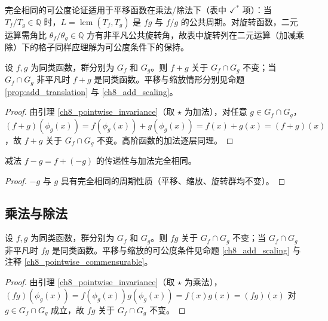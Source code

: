 \begin{remark}[平移与旋转在二元运算下的可公度条件]\label{ch8_pointwise_commensurable}
完全相同的可公度论证适用于平移函数在乘法/除法下（表中 $\checkmark^*$ 项）：当 $T_f/T_g\in\mathbb{Q}$ 时，$L=\operatorname{lcm}(T_f,T_g)$ 是 $fg$ 与 $f/g$ 的公共周期。对旋转函数，二元运算需角比 $\theta_f/\theta_g\in\mathbb{Q}$ 方有非平凡公共旋转角，故表中旋转列在二元运算（加减乘除）下的格子同样应理解为可公度条件下的保持。
\end{remark}

\begin{proposition}\label{prop:add_all}
设 $f, g$ 为同类函数，群分别为 $G_f$ 和 $G_g$。则 $f+g$ 关于 $G_f \cap G_g$ 不变；当 $G_f\cap G_g$ 非平凡时 $f+g$ 是同类函数。平移与缩放情形分别见命题 \ref{prop:add_translation} 与 \ref{ch8_add_scaling}。
\end{proposition}

\begin{proof}
由引理 \ref{ch8_pointwise_invariance}（取 $\star$ 为加法），对任意 $g \in G_f \cap G_g$，$(f+g)(\phi_g(x)) = f(\phi_g(x)) + g(\phi_g(x)) = f(x) + g(x) = (f+g)(x)$，故 $f+g$ 关于 $G_f\cap G_g$ 不变。高阶函数的加法逐层同理。
\end{proof}

\begin{proposition}[减法下各性质的传递性]\label{prop:subtraction_all}
减法 $f - g = f + (-g)$ 的传递性与加法完全相同。
\end{proposition}

\begin{proof}
$-g$ 与 $g$ 具有完全相同的周期性质（平移、缩放、旋转群均不变）。
\end{proof}

\subsection{乘法与除法}

\begin{proposition}\label{prop:mult_all}
设 $f, g$ 为同类函数，群分别为 $G_f$ 和 $G_g$。则 $fg$ 关于 $G_f \cap G_g$ 不变；当 $G_f\cap G_g$ 非平凡时 $fg$ 是同类函数。平移与缩放的可公度条件见命题 \ref{ch8_add_scaling} 与注释 \ref{ch8_pointwise_commensurable}。
\end{proposition}

\begin{proof}
由引理 \ref{ch8_pointwise_invariance}（取 $\star$ 为乘法），$(fg)(\phi_g(x)) = f(\phi_g(x))g(\phi_g(x)) = f(x)g(x) = (fg)(x)$ 对 $g\in G_f\cap G_g$ 成立，故 $fg$ 关于 $G_f\cap G_g$ 不变。
\end{proof}

